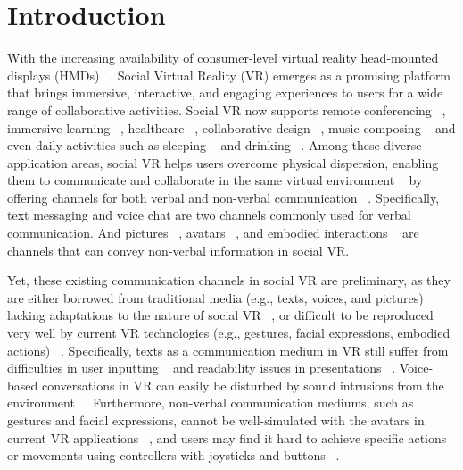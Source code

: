 \section{Introduction}
With the increasing availability of consumer-level virtual reality head-mounted displays (HMDs) ~\cite{anthes2016state, li2021social}, Social Virtual Reality (VR) emerges as a promising platform that brings immersive, interactive, and engaging experiences to users for a wide range of collaborative activities. 
Social VR now supports remote conferencing ~\cite{abdullah2021videoconference}, immersive learning ~\cite{thanyadit2022xr, peng2021exploring}, healthcare ~\cite{li2020designing, udapola2022social}, collaborative design ~\cite{mei2021cakevr}, music composing ~\cite{men2022supporting} and even daily activities such as sleeping ~\cite{maloney2020falling} and drinking ~\cite{chen2024drink}.
Among these diverse application areas, social VR helps users overcome physical dispersion, enabling them to communicate and collaborate in the same virtual environment ~\cite{li2021social, palmer1995interpersonal} by offering channels for both verbal and non-verbal communication ~\cite{dzardanova2022virtual, mcveigh2021case, wei2022communication}.
Specifically, text messaging and voice chat are two channels commonly used for verbal communication. 
And pictures ~\cite{li2019measuring}, avatars ~\cite{fu2023mirror, baker2021avatar, kolesnichenko2019understanding, freeman2021body}, and embodied interactions ~\cite{maloney2020talking, wieland2022non} are channels that can convey non-verbal information in social VR.

Yet, these existing communication channels in social VR are preliminary, as they are either borrowed from traditional media (e.g., texts, voices, and pictures) lacking adaptations to the nature of social VR ~\cite{montoya2023wordsphere, rzayev2021reading, dzardanova2022virtual, hsieh2020bridging}, or difficult to be reproduced very well by current VR technologies (e.g., gestures, facial expressions, embodied actions) ~\cite{sykownik2023vr, tanenbaum2020make, wei2022communication}.
Specifically, texts as a communication medium in VR still suffer from difficulties in user inputting ~\cite{montoya2023wordsphere} and readability issues in presentations ~\cite{rzayev2021reading, hsieh2020bridging}. 
Voice-based conversations in VR can easily be disturbed by sound intrusions from the environment ~\cite{akselrad2023body}. 
Furthermore, non-verbal communication mediums, such as gestures and facial expressions, cannot be well-simulated with the avatars in current VR applications ~\cite{baker2021avatar, aseeri2021influence, freeman2021body}, and users may find it hard to achieve specific actions or movements using controllers with joysticks and buttons ~\cite{sykownik2023vr, tanenbaum2020make, li2019measuring}.

